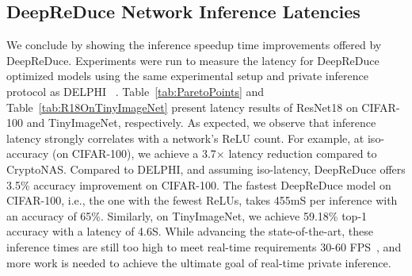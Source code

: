 %


\subsection{DeepReDuce Network Inference Latencies}

We conclude by showing the inference speedup time improvements offered by DeepReDuce.
Experiments were run to measure the latency for DeepReDuce optimized models using the same experimental setup and private inference protocol as DELPHI ~\cite{mishra2020delphi}.
Table~\ref{tab:ParetoPoints} and Table~\ref{tab:R18OnTinyImageNet} present latency results of ResNet18 on CIFAR-100 and TinyImageNet, respectively.  
As expected, we observe that inference latency strongly correlates with a network's ReLU count. 
For example, at iso-accuracy (on CIFAR-100), we achieve a 3.7$\times$ latency reduction compared to CryptoNAS. 
Compared to DELPHI, and assuming iso-latency, DeepReDuce offers 3.5\% accuracy improvement on CIFAR-100. 
The fastest DeepReDuce model on CIFAR-100, i.e., the one with the fewest ReLUs, takes 455mS per inference with an accuracy of 65\%.  
Similarly, on TinyImageNet, we achieve 59.18\% top-1 accuracy with a latency of 4.6S.
While advancing the state-of-the-art, these inference times are still too high to meet real-time requirements 30-60 FPS~\cite{edgeFB}, and more work is needed to achieve the ultimate goal of real-time private inference.


